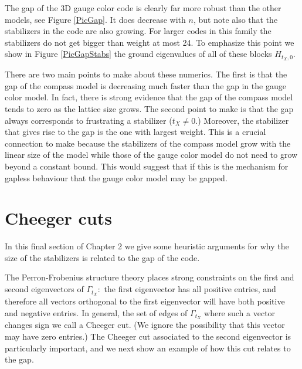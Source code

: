 The gap of the 3D gauge color code is clearly far more
robust than the other models, see Figure \ref{PicGap}.
It does decrease with $n$, but note also that the
stabilizers in the code are also growing.
For larger codes in this family the stabilizers do not get
bigger than weight at most 24.
To emphasize this point we show in Figure \ref{PicGapStabs}
the ground eigenvalues of all of these blocks $H_{t_X,0}.$

There are two main points to make about these numerics.
The first is that the gap of the compass model 
is decreasing much faster than the gap in the gauge color model.
In fact, there is strong evidence \cite{Dorier2005} 
that the gap of the compass model
tends to zero as the lattice size grows.
The second point to make
is that the gap always corresponds to frustrating
a stabilizer ($t_X\ne 0.$) 
Moreover, the stabilizer that
gives rise to the gap is the one with largest weight.
This is a crucial connection to make because the
stabilizers of the compass model grow with the linear
size of the model
while those of the gauge color model
do not need to grow beyond a constant bound.
This would suggest that if this is the mechanism for
gapless behaviour that the gauge color model may
be gapped.

\newpage
\section{Cheeger cuts}

In this final section of Chapter 2 
we give some heuristic
arguments for why the size of the stabilizers is
related to the gap of the code. 

The Perron-Frobenius structure theory places
strong constraints on the first and second
eigenvectors of $\Gamma_{t_X}:$
the first eigenvector has all positive entries,
and therefore all vectors orthogonal to the first
eigenvector will have both positive and negative entries.
In general, the set of edges of $\Gamma_{t_X}$ where
such a vector changes sign we call a Cheeger cut.
(We ignore the possibility that this vector
may have zero entries.)
The Cheeger cut associated to the second eigenvector
is particularly important, and we next show an
example of how this cut relates to the gap.

